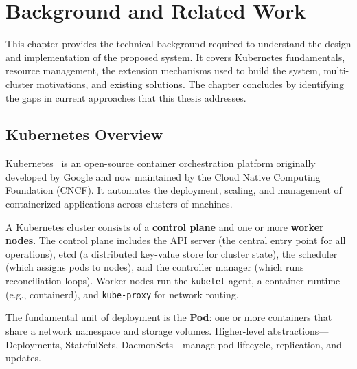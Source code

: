 
\chapter{Background and Related Work}
\label{ch:background}

This chapter provides the technical background required to understand the design and implementation of the proposed system. It covers Kubernetes fundamentals, resource management, the extension mechanisms used to build the system, multi-cluster motivations, and existing solutions. The chapter concludes by identifying the gaps in current approaches that this thesis addresses.


\section{Kubernetes Overview}
\label{sec:kubernetes-overview}

Kubernetes~\cite{kubernetes} is an open-source container orchestration platform originally developed by Google and now maintained by the Cloud Native Computing Foundation (CNCF). It automates the deployment, scaling, and management of containerized applications across clusters of machines.

A Kubernetes cluster consists of a \textbf{control plane} and one or more \textbf{worker nodes}. The control plane includes the API server (the central entry point for all operations), etcd (a distributed key-value store for cluster state), the scheduler (which assigns pods to nodes), and the controller manager (which runs reconciliation loops). Worker nodes run the \texttt{kubelet} agent, a container runtime (e.g., containerd), and \texttt{kube-proxy} for network routing.

The fundamental unit of deployment is the \textbf{Pod}: one or more containers that share a network namespace and storage volumes. Higher-level abstractions---Deployments, StatefulSets, DaemonSets---manage pod lifecycle, replication, and updates.

